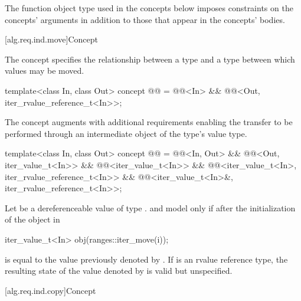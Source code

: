 \pnum
\begin{note}
The  function object type
used in the concepts below imposes constraints on the concepts' arguments
in addition to those that appear in the concepts' bodies.
\end{note}

[alg.req.ind.move]{Concept }

\pnum
The  concept specifies the relationship between
a  type and a  type
between which values may be moved.

\begin{codeblock}
template<class In, class Out>
  concept @@ =
    @@<In> &&
    @@<Out, iter_rvalue_reference_t<In>>;
\end{codeblock}

\pnum
The  concept augments
 with additional requirements enabling
the transfer to be performed through an intermediate object of the
 type's value type.

\begin{codeblock}
template<class In, class Out>
  concept @@ =
    @@<In, Out> &&
    @@<Out, iter_value_t<In>> &&
    @@<iter_value_t<In>> &&
    @@<iter_value_t<In>, iter_rvalue_reference_t<In>> &&
    @@<iter_value_t<In>&, iter_rvalue_reference_t<In>>;
\end{codeblock}

\pnum
Let  be a dereferenceable value of type .
 and  model 
only if after the initialization of the object  in
\begin{codeblock}
iter_value_t<In> obj(ranges::iter_move(i));
\end{codeblock}
 is equal to the value previously denoted by . If
 is an rvalue reference type,
the resulting state of the value denoted by  is
valid but unspecified.

[alg.req.ind.copy]{Concept }

